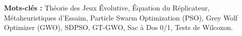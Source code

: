 \documentclass[12pt,a4paper]{report}
\begin{document}
\vspace{0.8cm}
\textbf{Mots-clés :} Théorie des Jeux Évolutive, Équation du Réplicateur, Métaheuristiques d'Essaim, Particle Swarm Optimization (PSO), Grey Wolf Optimizer (GWO), SDPSO, GT-GWO, Sac à Dos 0/1, Tests de Wilcoxon.

\newpage

\tableofcontents
\newpage

\listoffigures
\listoftables
\newpage

\setcounter{page}{1}


\newpage


\newpage


\newpage


\newpage


\newpage


\newpage



\end{document}
